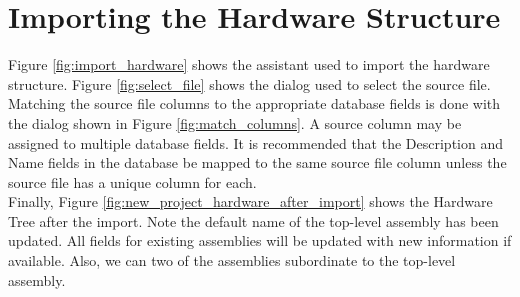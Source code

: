 \documentclass[11pt, 12pt, twoside, onecolumn]{book}
\begin{document}
\section{Importing the Hardware Structure}

\noindent Figure \ref{fig:import_hardware} shows the assistant used to import the hardware structure.  Figure \ref{fig:select_file} shows the dialog used to select the source file.  Matching the source file columns to the appropriate database fields is done with the dialog shown in Figure \ref{fig:match_columns}.  A source column may be assigned to multiple database fields.  It is recommended that the Description and Name fields in the database be mapped to the same source file column unless the source file has a unique column for each. \\

\noindent Finally, Figure \ref{fig:new_project_hardware_after_import} shows the Hardware Tree after the import.  Note the default name of the top-level assembly has been updated.  All fields for existing assemblies will be updated with new information if available.  Also, we can two of the assemblies subordinate to the top-level assembly. \\
\end{document}
